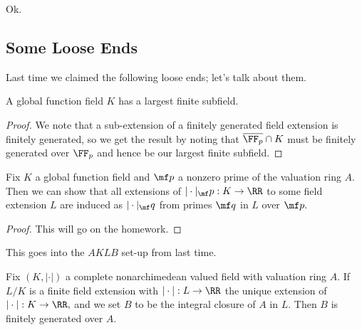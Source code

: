 
















Ok.

\subsection{Some Loose Ends}
Last time we claimed the following loose ends; let's talk about them.
\begin{lemma}
	A global function field $K$ has a largest finite subfield.
\end{lemma}
\begin{proof}
	We note that a sub-extension of a finitely generated field extension is finitely generated, so we get the result by noting that $\overline{\FF_p}\cap K$ must be finitely generated over $\FF_p$ and hence be our largest finite subfield.
\end{proof}
\begin{lemma}
	Fix $K$ a global function field and $\mf p$ a nonzero prime of the valuation ring $A.$ Then we can show that all extensions of $|\cdot|_\mf p:K\to\RR$ to some field extension $L$ are induced as $|\cdot|_\mf q$ from primes $\mf q$ in $L$ over $\mf p.$
\end{lemma}
\begin{proof}
	This will go on the homework.
\end{proof}
This goes into the $AKLB$ set-up from last time.
\begin{lemma}
	Fix $(K,|\cdot|)$ a complete nonarchimedean valued field with valuation ring $A.$ If $L/K$ is a finite field extension with $|\cdot|:L\to\RR$ the unique extension of $|\cdot|:K\to\RR,$ and we set $B$ to be the integral closure of $A$ in $L.$ Then $B$ is finitely generated over $A.$
\end{lemma}
